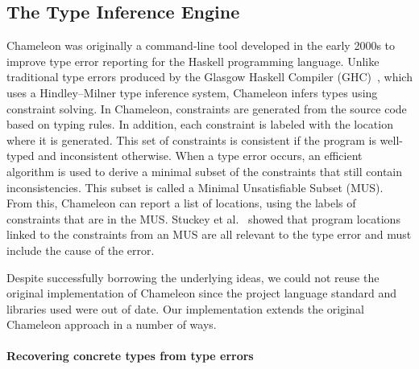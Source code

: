 \subsection{The Type Inference Engine}
\label{sec:typeinferenceengine}

Chameleon was originally a command-line tool developed in the early 2000s to improve type error reporting %
for the Haskell programming language.
Unlike traditional type errors produced by the Glasgow Haskell Compiler (GHC)~\cite{Gamari_undated-zu}, which uses a Hindley–Milner type inference system, Chameleon infers types using constraint solving. In Chameleon, constraints are generated from the source code based on typing rules. In addition, each constraint is labeled with the location where it is generated. This set of constraints is consistent if the program is well-typed and inconsistent otherwise. When a type error occurs, an efficient algorithm is used to derive a minimal subset of the constraints that still contain inconsistencies. This subset is called a Minimal Unsatisfiable Subset (MUS). From this, Chameleon can report a list of locations, using the labels of constraints that are in the MUS. Stuckey et al.~\cite{Stuckey2003-pz} showed that program locations linked to the constraints from an MUS are all relevant to the type error and must include the cause of the error.

Despite successfully borrowing the underlying ideas, we could not reuse the original implementation of Chameleon since the project language standard and libraries used were out of date. 
Our \chameleon{} implementation extends the original Chameleon approach in a number of ways.



\paragraph{Recovering concrete types from type errors}


